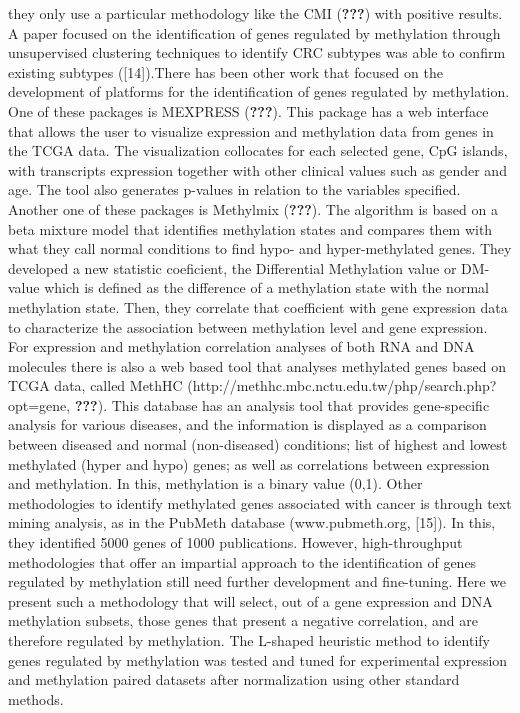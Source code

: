 \documentclass[10pt,letterpaper]{article}
\begin{document}
they only use a particular methodology like the CMI (\textbf{???}) with
positive results. A paper focused on the identification of genes
regulated by methylation through unsupervised clustering techniques to
identify CRC subtypes was able to confirm existing subtypes
({[}14{]}).There has been other work that focused on the development of
platforms for the identification of genes regulated by methylation. One
of these packages is MEXPRESS (\textbf{???}). This package has a web
interface that allows the user to visualize expression and methylation
data from genes in the TCGA data. The visualization collocates for each
selected gene, CpG islands, with transcripts expression together with
other clinical values such as gender and age. The tool also generates
p-values in relation to the variables specified. Another one of these
packages is Methylmix (\textbf{???}). The algorithm is based on a beta
mixture model that identifies methylation states and compares them with
what they call normal conditions to find hypo- and hyper-methylated
genes. They developed a new statistic coeficient, the Differential
Methylation value or DM-value which is defined as the difference of a
methylation state with the normal methylation state. Then, they
correlate that coefficient with gene expression data to characterize the
association between methylation level and gene expression. For
expression and methylation correlation analyses of both RNA and DNA
molecules there is also a web based tool that analyses methylated genes
based on TCGA data, called MethHC
(http://methhc.mbc.nctu.edu.tw/php/search.php?opt=gene, \textbf{???}).
This database has an analysis tool that provides gene-specific analysis
for various diseases, and the information is displayed as a comparison
between diseased and normal (non-diseased) conditions; list of highest
and lowest methylated (hyper and hypo) genes; as well as correlations
between expression and methylation. In this, methylation is a binary
value (0,1). Other methodologies to identify methylated genes associated
with cancer is through text mining analysis, as in the PubMeth database
(www.pubmeth.org, {[}15{]}). In this, they identified 5000 genes of 1000
publications. However, high-throughput methodologies that offer an
impartial approach to the identification of genes regulated by
methylation still need further development and fine-tuning. Here we
present such a methodology that will select, out of a gene expression
and DNA methylation subsets, those genes that present a negative
correlation, and are therefore regulated by methylation. The L-shaped
heuristic method to identify genes regulated by methylation was tested
and tuned for experimental expression and methylation paired datasets
after normalization using other standard methods.
\end{document}
